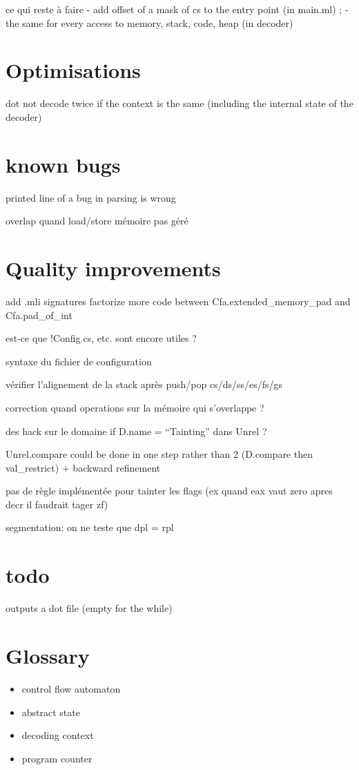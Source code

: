 \documentclass{report}
\begin{document}
ce qui reste à faire
- add offset of a mask of cs to the entry point (in main.ml) ;
- the same for every access to memory, stack, code, heap (in decoder)

\chapter{Optimisations}
dot not decode twice if the context is the same (including the
internal state of the decoder)
\chapter{known bugs}
printed line of a bug in parsing is wrong

overlap quand load/store mémoire pas géré
\chapter{Quality improvements}
add  .mli signatures
factorize more code between Cfa.extended_memory_pad and
Cfa.pad_of_int 

est-ce que !Config.cs, etc. sont encore utiles ?

syntaxe du fichier de configuration

vérifier l'alignement de la stack après push/pop cs/ds/ss/es/fs/gs

correction quand operations sur la mémoire qui s'overlappe  ?

des hack sur le domaine if D.name = ``Tainting'' dans Unrel ?

Unrel.compare could be done in one step rather than 2 (D.compare then
val_restrict) + backward refinement


pas de règle implémentée pour tainter les flags (ex quand eax vaut
zero apres decr il faudrait tager zf)

segmentation: on ne teste que dpl = rpl
\chapter{todo}
outputs a dot file (empty for the while)
\chapter{Glossary}
\begin{itemize}
\item control flow automaton
\item abstract state
\item decoding context
\item program counter
\end{itemize}
\end{document}

